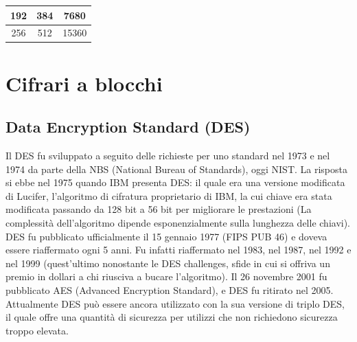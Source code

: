 \begin{table}
\begin{tabular}{|c|c|c|}
\hline
192                                                                                                                                                            & 384                                                                                                                             & 7680                                                                                                             \\ 
\hline
256                                                                                                                                                            & 512                                                                                                                             & 15360                                                                                                            \\
\hline
\end{tabular}
\end{table}

\section{Cifrari a blocchi}
\subsection{Data Encryption Standard (DES)}
Il DES fu sviluppato a seguito delle richieste per uno standard nel 1973 e nel 1974 da parte della NBS (National Bureau of Standards), oggi NIST. La risposta si ebbe nel 1975 quando IBM presenta DES: il quale era una versione modificata di Lucifer, l'algoritmo di cifratura proprietario di IBM, la cui chiave era stata modificata passando da 128 bit a 56 bit per migliorare le prestazioni (La complessità dell'algoritmo dipende esponenzialmente sulla lunghezza delle chiavi). DES fu pubblicato ufficialmente il 15 gennaio 1977 (FIPS PUB 46) e doveva essere riaffermato ogni 5 anni. Fu infatti riaffermato nel 1983, nel 1987, nel 1992 e nel 1999 (quest'ultimo nonostante le DES challenges, sfide in cui si offriva un premio in dollari a chi riusciva a bucare l'algoritmo). Il 26 novembre 2001 fu pubblicato AES (Advanced Encryption Standard), e DES fu ritirato nel 2005. Attualmente DES può essere ancora utilizzato con la sua versione di triplo DES, il quale offre una quantità di sicurezza per utilizzi che non richiedono sicurezza troppo elevata. 

